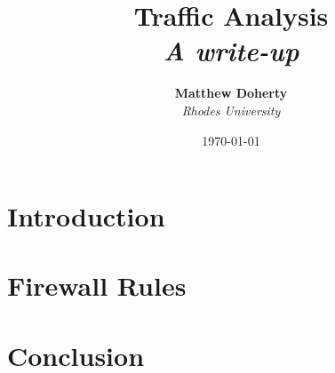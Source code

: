 \documentclass[11pt]{diazessay} %
\title{\textbf{Traffic Analysis} \\ {\Large\itshape A write-up}} %
\author{\textbf{Matthew Doherty} \\ \textit{Rhodes University}} %
\date{\today} %
\begin{document}
\maketitle %



\renewcommand{\thesection}{\arabic{section}}
\renewcommand{\thesubsection}{\arabic{subsection}}
\renewcommand{\thesubsubsection}{\arabic{subsubsection}}
\renewcommand{\thesubsection}{\thesection.\arabic{subsection}}
\renewcommand{\thesubsubsection}{\thesubsection.\arabic{subsubsection}}

\vspace{30pt} %



\section{Introduction}




\section{}



\section{Firewall Rules}


\section{Conclusion}


\clearpage
%



\end{document}
